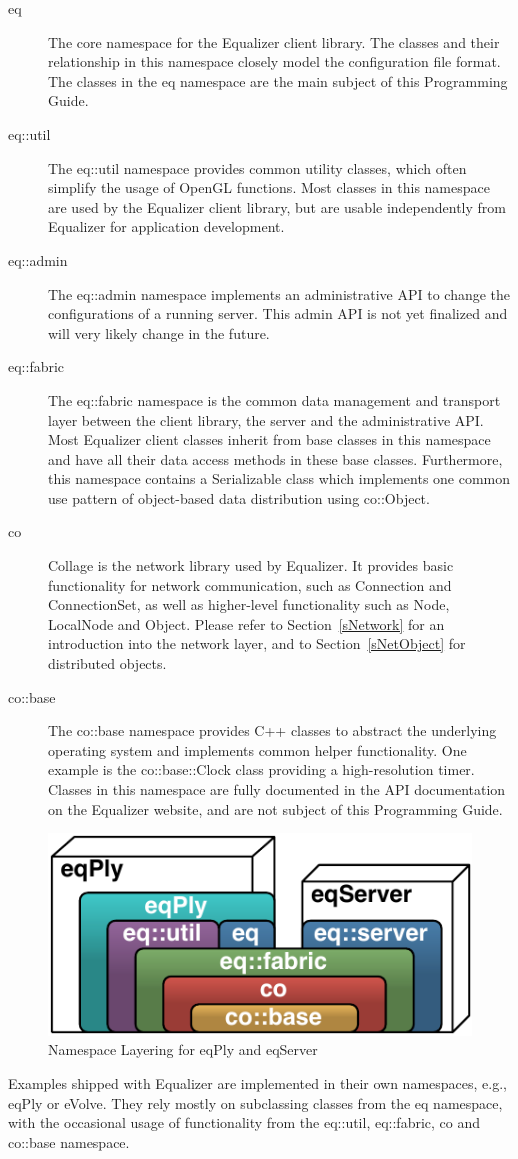 \documentclass[10pt,a4]{scrartcl}
\newcommand{\sref}[1]{Section~\ref{#1}}
\begin{document}
\begin{description}
\item[eq] The core namespace for the Equalizer client library. The
  classes and their relationship in this namespace closely model the
  configuration file format. The classes in the \textsf{eq} namespace
  are the main subject of this Programming Guide.
\item[eq::util] The eq::util namespace provides common utility classes, which
  often simplify the usage of OpenGL functions. Most classes in this namespace
  are used by the Equalizer client library, but are usable independently
  from Equalizer for application development.
\item[eq::admin] The eq::admin namespace implements an administrative API to
  change the configurations of a running server. This admin API is not yet
  finalized and will very likely change in the future.
\item[eq::fabric] The eq::fabric namespace is the common data management and
  transport layer between the client library, the server and the administrative
  API. Most Equalizer client classes inherit from base classes in this namespace
  and have all their data access methods in these base classes. Furthermore,
  this namespace contains a \textsf{Serializable} class which implements one
  common use pattern of object-based data distribution using
  \textsf{co::Object}.
\item[co] Collage is the network library used by Equalizer. It provides basic
  functionality for network communication, such as \textsf{Connection} and
  \textsf{ConnectionSet}, as well as higher-level functionality such as
  \textsf{Node}, \textsf{LocalNode} and \textsf{Object}. Please refer to
  \sref{sNetwork} for an introduction into the network layer, and to
  \sref{sNetObject} for distributed objects.
\item[co::base] The co::base namespace provides C++ classes to abstract
  the underlying operating system and implements common helper
  functionality. One example is the \textsf{co::base::Clock} class
  providing a high-resolution timer. Classes in this namespace are fully
  documented in the API documentation on the Equalizer website, and are
  not subject of this Programming Guide.
\end{description}

\begin{figure}
  \includegraphics[width=.382\textwidth]{images/namespaces}
  {\caption{\label{fNamespaces}Namespace Layering for eqPly and eqServer}}
\end{figure}
Examples shipped with Equalizer are implemented in their own namespaces, e.g.,
\textsf{eqPly} or \textsf{eVolve}. They rely mostly on subclassing classes from
the \textsf{eq} namespace, with the occasional usage of functionality from the
\textsf{eq::util}, \textsf{eq::fabric}, \textsf{co} and \textsf{co::base}
namespace.
\end{document}
